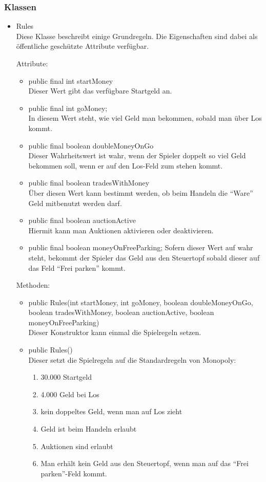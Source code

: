 \documentclass[a4paper,10pt]{article}
\begin{document}
\subsubsection{Klassen}
\begin{itemize}
\item Rules \\
Diese Klasse beschreibt einige Grundregeln. Die Eigenschaften sind dabei als öffentliche geschützte Attribute verfügbar.

Attribute:
\begin{itemize}
\item public final int startMoney \\
Dieser Wert gibt das verfügbare Startgeld an.
\item public final int goMoney; \\
In diesem Wert steht, wie viel Geld man bekommen, sobald man über Los kommt.
\item public final boolean doubleMoneyOnGo \\
Dieser Wahrheitswert ist wahr, wenn der Spieler doppelt so viel Geld bekommen soll, wenn er auf den Los-Feld zum stehen kommt.
\item public final boolean tradesWithMoney \\
Über diesen Wert kann bestimmt werden, ob beim Handeln die "`Ware"' Geld mitbenutzt werden darf.
\item public final boolean auctionActive \\
Hiermit kann man Auktionen aktivieren oder deaktivieren.
\item public final boolean moneyOnFreeParking;
Sofern dieser Wert auf wahr steht, bekommt der Spieler das Geld aus den Steuertopf sobald dieser auf das Feld "`Frei parken"' kommt.
\end{itemize}

Methoden:
\begin{itemize}
\item public Rules(int startMoney, int goMoney, boolean doubleMoneyOnGo, boolean tradesWithMoney, boolean auctionActive, boolean moneyOnFreeParking) \\
Dieser Konstruktor kann einmal die Spielregeln setzen.
\item public Rules() \\
Dieser setzt die Spielregeln auf die Standardregeln von Monopoly:
\begin{enumerate}
\item 30.000 Startgeld
\item 4.000 Geld bei Los
\item kein doppeltes Geld, wenn man auf Los zieht
\item Geld ist beim Handeln erlaubt
\item Auktionen sind erlaubt
\item Man erhält kein Geld aus den Steuertopf, wenn man auf das "`Frei parken"'-Feld kommt.
\end{enumerate}
\end{itemize}
\end{itemize} %
\end{document}
